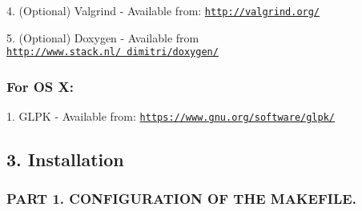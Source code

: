 \begin{DoxyPre}4. (Optional) Valgrind - Available from: \href{http://valgrind.org/}{\tt http://valgrind.org/}\end{DoxyPre}



\begin{DoxyPre}5. (Optional) Doxygen - Available from \href{http://www.stack.nl/~dimitri/doxygen/}{\tt http://www.stack.nl/~dimitri/doxygen/}\end{DoxyPre}



\begin{DoxyPre}\subsubsection*{For OS X:}\end{DoxyPre}



\begin{DoxyPre}\end{DoxyPre}



\begin{DoxyPre}1. GLPK - Available from: \href{https://www.gnu.org/software/glpk/}{\tt https://www.gnu.org/software/glpk/}


\end{DoxyPre}



\begin{DoxyPre}\subsection*{3. Installation}\end{DoxyPre}



\begin{DoxyPre}\end{DoxyPre}



\begin{DoxyPre}\subsubsection*{PART 1. CONFIGURATION OF THE MAKEFILE.}\end{DoxyPre}



\begin{DoxyPre}\end{DoxyPre}



